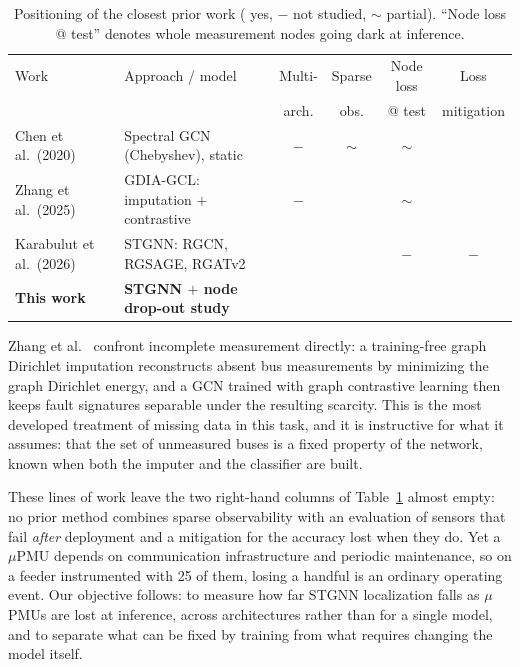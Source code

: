 \documentclass[3p,times,procedia]{elsarticle}
\newcommand{\yes}{\checkmark}
\newcommand{\no}{\ensuremath{-}}
\newcommand{\pt}{\ensuremath{\sim}}
\begin{document}
\begin{table}[!t]
  \centering
  \caption{Positioning of the closest prior work (\yes{} yes, \no{} not studied,
           \pt{} partial). ``Node loss @ test'' denotes whole measurement nodes
           going dark at inference.}
  \label{tab:related}
  \footnotesize
  \setlength{\tabcolsep}{4pt}
  \begin{tabular}{@{}llcccc@{}}
    \toprule
    Work & Approach / model
         & Multi- & Sparse & Node loss & Loss \\
         &
         & arch.  & obs.    & @ test   & mitigation \\
    \midrule
    Chen et al.\ (2020) \cite{chen2020}
      & Spectral GCN (Chebyshev), static
      & \no & \pt & \pt & \yes \\
    Zhang et al.\ (2025) \cite{zhang2025}
      & GDIA-GCL: imputation $+$ contrastive
      & \no & \yes & \pt & \yes \\
    Karabulut et al.\ (2026) \cite{Karabulut2026}
      & STGNN: RGCN, RGSAGE, RGATv2
      & \yes & \yes & \no & \no \\
    \textbf{This work}
      & \textbf{STGNN $+$ node drop-out study}
      & \yes & \yes & \yes & \yes \\
    \bottomrule
  \end{tabular}
\end{table}

Zhang et al.~\cite{zhang2025} confront incomplete measurement directly: a training-free graph Dirichlet imputation reconstructs absent bus measurements by minimizing the graph Dirichlet energy, and a GCN trained with graph contrastive learning then keeps fault signatures separable under the resulting scarcity. This is the most developed treatment of missing data in this task, and it is instructive for what it assumes: that the set of unmeasured buses is a fixed property of the network, known when both the imputer and the classifier are built.

These lines of work leave the two right-hand columns of Table~\ref{tab:related} almost empty: no prior method combines sparse observability with an evaluation of sensors that fail \emph{after} deployment and a mitigation for the accuracy lost when they do. Yet a $\mu$PMU depends on communication infrastructure and periodic maintenance, so on a feeder instrumented with 25 of them, losing a handful is an ordinary operating event. Our objective follows: to measure how far STGNN localization falls as $\mu$PMUs are lost at inference, across architectures rather than for a single model, and to separate what can be fixed by training from what requires changing the model itself.
\end{document}
